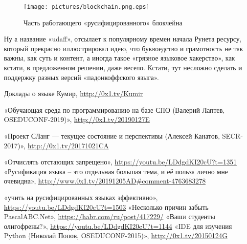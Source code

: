 ﻿\documentclass[a4paper,12pt]{article}
\begin{document}
\begin{figure}
\centering
\texttt{[image: pictures/blockchain.png.eps]}
\caption{Часть работающего «русифицированного» блокчейна}
\end{figure}


Ну а название «udaff», отсылает к популярному времен начала Рунета
ресурсу, который прекрасно иллюстрировал идею, что буквоедство и
грамотность не так важны, как суть и контент, а иногда такое «грязное
языковое хакерство», как кстати, в предложенном решении, даже весело.
Кстати, тут несложно сделать и поддержку разных версий «падонкоффского
языга».

\begin{thebibliography}{9}
     Доклады о языке Кумир, \url{http://0x1.tv/Kumir}

     «Обучающая среда по программированию на базе СПО (Валерий Лаптев, OSEDUCONF-2019)», \url{http://0x1.tv/20190127E}

     «Проект СЛанг — текущее состояние и перспективы (Алексей Канатов, SECR-2017)», \url{http://0x1.tv/20171021CA}

     «Отчислять отстающих запрещено», \url{https://youtu.be/LDdgdKI20cU?t=1351}
     «Русификация языка -- это отдельная большая тема, и её польза лично мне очевидна», \url{http://www.0x1.tv/20191205AD#comment-4763683278}

     «учить на русифицированных
    языках эффективно», \url{https://youtu.be/LDdgdKI20cU?t=1503}
     «Несколько причин забыть PascalABC.Net», \url{https://habr.com/ru/post/417229/}
     «Ваши студенты олигофрены?», \url{https://youtu.be/LDdgdKI20cU?t=1144}
     «IDE для изучения Python (Николай Попов, OSEDUCONF-2015)», \url{http://0x1.tv/20150124G}
\end{thebibliography}
\end{document}
